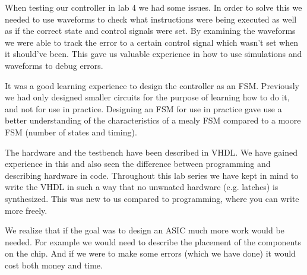 \documentclass[a4paper,11pt]{article}
\begin{document}
When testing our controller in lab 4 we had some issues. In order to solve this we needed to use waveforms to check what instructions were being executed as well as if the correct state and control signals were set. By examining the waveforms we were able to track the error to a certain control signal which wasn't set when it should've been. This gave us valuable experience in how to use simulations and waveforms to debug errors.

It was a good learning experience to design the controller as an FSM. Previously we had only designed smaller circuits for the purpose of learning how to do it, and not for use in practice. Designing an FSM for use in practice gave use a better understanding of the characteristics of a mealy FSM compared to a moore FSM (number of states and timing).

The hardware and the testbench have been described in VHDL. We have gained experience in this and also seen the difference between programming and describing hardware in code. Throughout this lab series we have kept in mind to write the VHDL in such a way that no unwnated  hardware (e.g. latches) is synthesized. This was new to us compared to programming, where you can write more freely.

We realize that if the goal was to design an ASIC much more work would be needed. For example we would need to describe the placement of the components on the chip. And if we were to make some errors (which we have done) it would cost both money and time.
\end{document}
